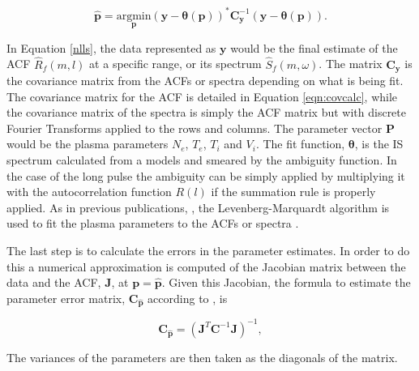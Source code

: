 \begin{equation}
	\mathbf{\hat{p}}= \underset{\mathbf{p}}{\text{argmin}} (\mathbf{y}-\bm{\theta}(\mathbf{p}))^*\mathbf{C}_{\mathbf{y}}^{-1}(\mathbf{y}-\bm{\theta}(\mathbf{p})).
\label{nlls}
\end{equation}

In Equation \ref{nlls}, the data represented as $\mathbf{y}$ would be the final estimate of the ACF $\widehat{R}_f(m,l)$ at a specific range, or its spectrum $\widehat{S}_f(m,\omega)$. The matrix $\mathbf{C}_{\mathbf{y}}$  is the covariance matrix from the ACFs or spectra depending on what is being fit. The covariance matrix for the ACF is detailed in Equation \ref{eqn:covcalc}, while the covariance matrix of the spectra is simply the ACF matrix but with discrete Fourier Transforms applied to the rows and columns. The parameter vector $\mathbf{P}$ would be the plasma parameters $N_e$, $T_e$, $T_i$ and $V_i$. The fit function, $\bm{\theta}$, is the IS spectrum calculated from a models \cite{kudeki:milla:1} and smeared by the ambiguity function. In the case of the long pulse the ambiguity can be simply applied by multiplying it with the autocorrelation function $R(l)$ if the summation rule is properly applied. As in previous publications, \cite{nikoukar2008}, the Levenberg-Marquardt algorithm is used to fit the plasma parameters to the ACFs or spectra \cite{levenberg1944,marquardt:1963}.

The last step is to calculate the errors in the parameter estimates. In order to do this a numerical approximation is computed of the Jacobian matrix between the data and the ACF, $\mathbf{J}$, at $\mathbf{p}=\mathbf{\hat{p}}$. Given this Jacobian, the formula to estimate the parameter error matrix, $\mathbf{C}_{\mathbf{\hat{p}}}$ according to \cite{Hysell:2000cq}, is

\begin{equation}
\label{eqn:jacinv}
\mathbf{C}_{\mathbf{\hat{p}}}=(\mathbf{J}^T \mathbf{C}^{-1}\mathbf{J})^{-1},
\end{equation}

\noindent  The variances of the parameters are then taken as the diagonals of the matrix. 

